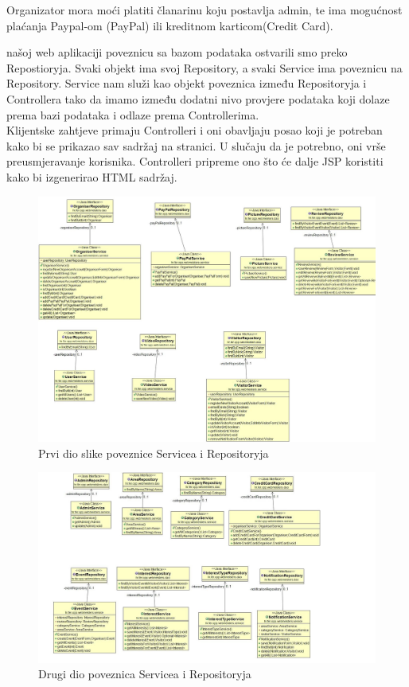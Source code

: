 		\normalfont\noindent Organizator mora moći platiti članarinu koju postavlja admin, te ima mogućnost plaćanja Paypal-om (PayPal) ili kreditnom karticom(Credit Card).
		
		\normalfont\noindent našoj web aplikaciji poveznicu sa bazom podataka ostvarili smo preko Repostioryja. Svaki objekt ima svoj Repository, a svaki Service ima poveznicu na Repository.  Service nam služi kao objekt poveznica između Repositoryja i Controllera tako da imamo između dodatni nivo provjere podataka koji dolaze prema bazi podataka i odlaze prema Controllerima.\\
		
		
		\noindent Klijentske zahtjeve primaju Controlleri i oni obavljaju posao koji je potreban kako bi se prikazao sav sadržaj na stranici. U slučaju da je potrebno, oni vrše preusmjeravanje korisnika. Controlleri pripreme ono što će dalje JSP koristiti kako bi izgenerirao HTML sadržaj.
		
		\begin{figure}[H]
			\includegraphics[scale=0.4]{slike/dijagram1a.jpg}
			\centering
			\caption{Prvi dio slike poveznice Servicea i Repositoryja}
			\label{fig:dijagramraz1}
		\end{figure}
	
		\begin{figure}[H]
			\includegraphics[scale=0.4]{slike/dijagram1b.jpg}
			\centering
			\caption{Drugi dio poveznica Servicea i Repositoryja}
			\label{fig:dijagramraz2}
		\end{figure}
	
